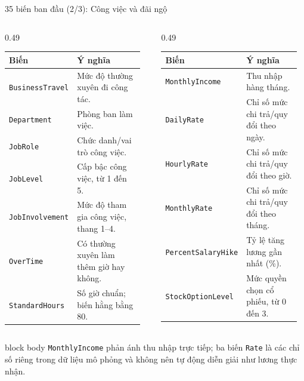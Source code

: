 \documentclass[10pt,aspectratio=169]{beamer}
\begin{document}
\begin{frame}{35 biến ban đầu (2/3): Công việc và đãi ngộ}
  \scriptsize
  \renewcommand{\arraystretch}{1.10}
  \begin{columns}[T,onlytextwidth]
    \begin{column}{0.49\textwidth}
      \begin{tabular}{>{\raggedright\arraybackslash}p{0.39\linewidth}
                      >{\raggedright\arraybackslash}p{0.55\linewidth}}
        \toprule
        \textbf{Biến} & \textbf{Ý nghĩa}\\
        \midrule
        \texttt{BusinessTravel} & Mức độ thường xuyên đi công tác.\\
        \texttt{Department} & Phòng ban làm việc.\\
        \texttt{JobRole} & Chức danh/vai trò công việc.\\
        \texttt{JobLevel} & Cấp bậc công việc, từ 1 đến 5.\\
        \texttt{JobInvolvement} & Mức độ tham gia công việc, thang 1--4.\\
        \texttt{OverTime} & Có thường xuyên làm thêm giờ hay không.\\
        \texttt{StandardHours} & Số giờ chuẩn; biến hằng bằng 80.\\
        \bottomrule
      \end{tabular}
    \end{column}
    \begin{column}{0.49\textwidth}
      \begin{tabular}{>{\raggedright\arraybackslash}p{0.39\linewidth}
                      >{\raggedright\arraybackslash}p{0.55\linewidth}}
        \toprule
        \textbf{Biến} & \textbf{Ý nghĩa}\\
        \midrule
        \texttt{MonthlyIncome} & Thu nhập hàng tháng.\\
        \texttt{DailyRate} & Chỉ số mức chi trả/quy đổi theo ngày.\\
        \texttt{HourlyRate} & Chỉ số mức chi trả/quy đổi theo giờ.\\
        \texttt{MonthlyRate} & Chỉ số mức chi trả/quy đổi theo tháng.\\
        \texttt{PercentSalaryHike} & Tỷ lệ tăng lương gần nhất (\%).\\
        \texttt{StockOptionLevel} & Mức quyền chọn cổ phiếu, từ 0 đến 3.\\
        \bottomrule
      \end{tabular}
    \end{column}
  \end{columns}

  \vspace{0.24cm}
  \begin{beamercolorbox}[sep=0.13cm,rounded=true]{block body}
    \centering\small
    \texttt{MonthlyIncome} phản ánh thu nhập trực tiếp; ba biến
    \texttt{Rate} là các chỉ số riêng trong dữ liệu mô phỏng và không nên
    tự động diễn giải như lương thực nhận.
  \end{beamercolorbox}
\end{frame}
\end{document}
